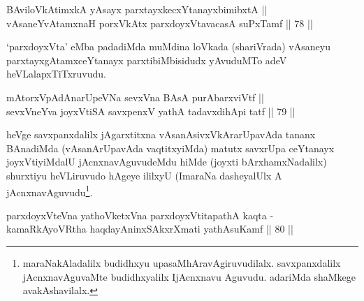 \begin{shl}
\footnotemark[1]BAviloVkAtimxkA yA\s sayx parxtayxkecxYtanayxbimibxtA || \\
vAsaneYvA\s \s tamxnaH porxVkAtx parxdoyxVtavacasA suPxTamf \hfill || 78 ||  
\end{shl}

\begin{artha}
`parxdoyxVta' eMba padadiMda muMdina loVkada (shariVrada) vAsaneyu
parxtayxgAtamxceYtanayx parxtibiMbisidudx yAvuduMTo adeV heVLalapxTiTxruvudu.
\end{artha}


\begin{shl}
mAtorxVpAdAnarUpeVNa sevxVna BAsA purA\s barxviVtf || \\
sevxVneYva joyxVtiSA savxpenxV yathA tadavxdihApi tatf \hfill || 79 || 
\end{shl}

\begin{artha}
heVge savxpanxdalilx jAgarxtitxna vAsanAsivxVkArarUpavAda tananx
BAnadiMda (vAsanArUpavAda vaqtitxyiMda) matutx savxrUpa ceYtanayx
joyxVtiyiMdalU jAcnxnavAguvudeMdu hiMde (joyxti bArxhamxNadalilx)
shurxtiyu heVLiruvudo hAgeye ililxyU (ImaraNa dasheyalUlx A
jAcnxnavAguvudu\footnote{maraNakAladalilx budidhxyu
upasaMhAravAgiruvudilalx. savxpanxdalilx jAcnxnavAguvaMte
budidhxyalilx IjAcnxnavu Aguvudu. adariMda shaMkege avakAshavilalx.}.
\end{artha}


\begin{shl}
parxdoyxVteVna yathoVketxVna parxdoyxVtitapathA kaqta -\\
kamaRkAyoVR\s tha haqdayAninxSAkxrXmati yathAsuKamf \hfill || 80 ||  
\end{shl}


